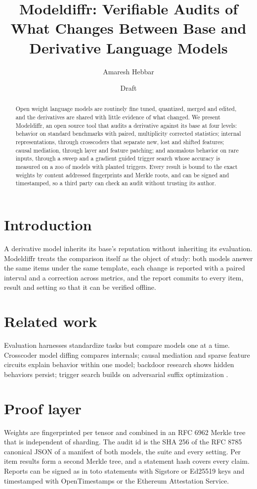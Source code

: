 \documentclass[11pt]{article}
\title{Modeldiffr: Verifiable Audits of What Changes Between Base and Derivative Language Models}
\author{Amaresh Hebbar}
\date{Draft}
\begin{document}
\maketitle

\begin{abstract}
Open weight language models are routinely fine tuned, quantized, merged and edited, and the derivatives are shared with little evidence of what changed. We present Modeldiffr, an open source tool that audits a derivative against its base at four levels: behavior on standard benchmarks with paired, multiplicity corrected statistics; internal representations, through crosscoders that separate new, lost and shifted features; causal mediation, through layer and feature patching; and anomalous behavior on rare inputs, through a sweep and a gradient guided trigger search whose accuracy is measured on a zoo of models with planted triggers. Every result is bound to the exact weights by content addressed fingerprints and Merkle roots, and can be signed and timestamped, so a third party can check an audit without trusting its author.
\end{abstract}

\section{Introduction}
A derivative model inherits its base's reputation without inheriting its evaluation. Modeldiffr treats the comparison itself as the object of study: both models answer the same items under the same template, each change is reported with a paired interval and a correction across metrics, and the report commits to every item, result and setting so that it can be verified offline.

\section{Related work}
Evaluation harnesses standardize tasks but compare models one at a time. Crosscoder model diffing \citep{lindsey2024crosscoders,minder2025crosscoders} compares internals; causal mediation \citep{vig2020causal,meng2022rome} and sparse feature circuits \citep{marks2024circuits} explain behavior within one model; backdoor research \citep{hubinger2024sleeper,rando2024universal} shows hidden behaviors persist; trigger search builds on adversarial suffix optimization \citep{zou2023gcg}.

\section{Proof layer}
Weights are fingerprinted per tensor and combined in an RFC 6962 Merkle tree that is independent of sharding. The audit id is the SHA 256 of the RFC 8785 canonical JSON of a manifest of both models, the suite and every setting. Per item results form a second Merkle tree, and a statement hash covers every claim. Reports can be signed as in toto statements with Sigstore or Ed25519 keys and timestamped with OpenTimestamps or the Ethereum Attestation Service.
\end{document}
